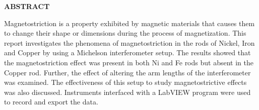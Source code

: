 \begin{center}
{\large {\bf  ABSTRACT }}

Magnetostriction is a property exhibited by magnetic materials that causes them to change their shape or dimensions during the process of magnetization. This report investigates the phenomena of magnetostriction in the rods of Nickel, Iron and Copper by using a Michelson interferometer setup. The results showed that the magnetostriction effect was present in both Ni and Fe rods but absent in the Copper rod. Further, the effect of altering the arm lengths of the interferometer was examined. The effectiveness of this setup to study magnetostrictive effects was also discussed. Instruments interfaced with a LabVIEW program were used to record and export the data.
\end{center}  


    

